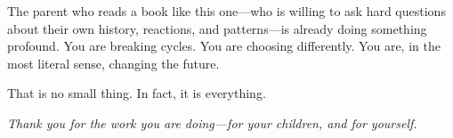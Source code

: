 \bigskip

The parent who reads a book like this one---who is willing to ask hard 
questions about their own history, reactions, and patterns---is already 
doing something profound. You are breaking cycles. You are choosing 
differently. You are, in the most literal sense, changing the future.

That is no small thing. In fact, it is everything.

\bigskip
\noindent\textit{Thank you for the work you are doing---for your 
children, and for yourself.}
